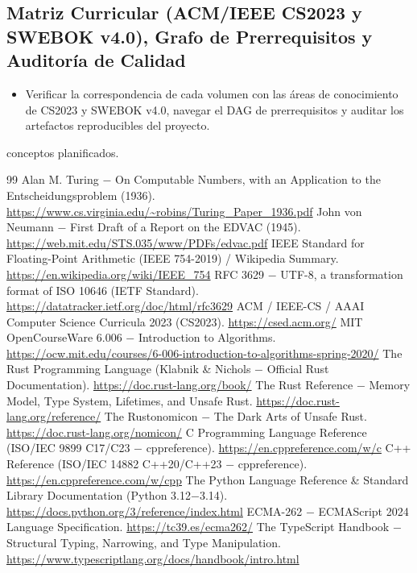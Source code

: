 \documentclass{book}
\begin{document}
\subsection*{\checkmark Matriz Curricular (ACM/IEEE CS2023 y SWEBOK v4.0), Grafo de Prerrequisitos y Auditoría de Calidad}
\begin{itemize}
\item Verificar la correspondencia de cada volumen con las áreas de conocimiento de CS2023 y SWEBOK v4.0, navegar el DAG de prerrequisitos y auditar los artefactos reproducibles del proyecto.
\end{itemize}
 conceptos planificados.
\backmatter
\begin{thebibliography}{99}
 Alan M. Turing \(-\) On Computable Numbers, with an Application to the Entscheidungsproblem (1936). \url{https://www.cs.virginia.edu/~robins/Turing_Paper_1936.pdf}
 John von Neumann \(-\) First Draft of a Report on the EDVAC (1945). \url{https://web.mit.edu/STS.035/www/PDFs/edvac.pdf}
 IEEE Standard for Floating-Point Arithmetic (IEEE 754-2019) / Wikipedia Summary. \url{https://en.wikipedia.org/wiki/IEEE_754}
 RFC 3629 \(-\) UTF-8, a transformation format of ISO 10646 (IETF Standard). \url{https://datatracker.ietf.org/doc/html/rfc3629}
 ACM / IEEE-CS / AAAI Computer Science Curricula 2023 (CS2023). \url{https://csed.acm.org/}
 MIT OpenCourseWare 6.006 \(-\) Introduction to Algorithms. \url{https://ocw.mit.edu/courses/6-006-introduction-to-algorithms-spring-2020/}
 The Rust Programming Language (Klabnik \& Nichols \(-\) Official Rust Documentation). \url{https://doc.rust-lang.org/book/}
 The Rust Reference \(-\) Memory Model, Type System, Lifetimes, and Unsafe Rust. \url{https://doc.rust-lang.org/reference/}
 The Rustonomicon \(-\) The Dark Arts of Unsafe Rust. \url{https://doc.rust-lang.org/nomicon/}
 C Programming Language Reference (ISO/IEC 9899 C17/C23 \(-\) cppreference). \url{https://en.cppreference.com/w/c}
 C++ Reference (ISO/IEC 14882 C++20/C++23 \(-\) cppreference). \url{https://en.cppreference.com/w/cpp}
 The Python Language Reference \& Standard Library Documentation (Python 3.12\(-\)3.14). \url{https://docs.python.org/3/reference/index.html}
 ECMA-262 \(-\) ECMAScript 2024 Language Specification. \url{https://tc39.es/ecma262/}
 The TypeScript Handbook \(-\) Structural Typing, Narrowing, and Type Manipulation. \url{https://www.typescriptlang.org/docs/handbook/intro.html}

\end{thebibliography}
\end{document}
